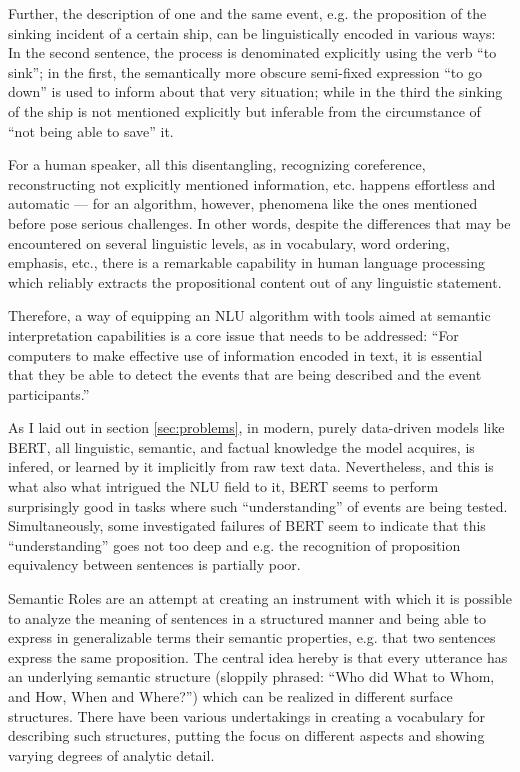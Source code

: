 Further, the description of one and the same event, e.g. the proposition of the sinking incident
of a certain ship, can be linguistically encoded in various ways: In the second sentence, the
process is denominated explicitly using the verb ``to sink''; in the first, the semantically more
obscure semi-fixed expression ``to go down'' is used to inform about that very situation; while in
the third the sinking of the ship is not mentioned explicitly but inferable from the circumstance
of ``not being able to save'' it.

For a human speaker, all this disentangling, recognizing coreference, reconstructing
not explicitly mentioned information, etc. happens effortless and automatic --- for an
algorithm, however, phenomena like the ones mentioned before pose serious challenges. In
other words, despite the differences that may be encountered on several linguistic levels, as in
vocabulary, word ordering, emphasis, etc., there is a remarkable capability in human
language processing which reliably extracts the propositional content out of any
linguistic statement.

Therefore, a way of equipping an NLU algorithm with tools aimed at semantic interpretation
capabilities is a core issue that needs to be addressed: ``For computers to make effective
use of information encoded in text, it is essential that they be able to detect the events
that are being described and the event participants.'' \citep{palmer2010semantic}

As I laid out in section \ref{sec:problems}, in modern, purely data-driven models like
BERT, all linguistic, semantic, and factual knowledge the model acquires, is infered,
or learned by it implicitly from raw text data. Nevertheless, and this is what also
what intrigued the NLU field to it, BERT seems to perform surprisingly good in tasks
where such ``understanding'' of events are being tested. Simultaneously, some
investigated failures of BERT seem to indicate that this ``understanding'' goes not too
deep and e.g. the recognition of proposition equivalency between sentences is partially
poor.

Semantic Roles are an attempt at creating an instrument with which it is possible to analyze the
meaning of sentences in a structured manner and being able to express in generalizable terms
their semantic properties, e.g. that two sentences express the same proposition. The central idea
hereby is that every utterance has an underlying semantic structure
(sloppily phrased: ``Who did What to Whom, and How, When and Where?'') which can be realized in
different surface structures. There have been various undertakings in creating a vocabulary for
describing such structures, putting the focus on different aspects and showing varying degrees of
{\color{red} analytic detail}.

